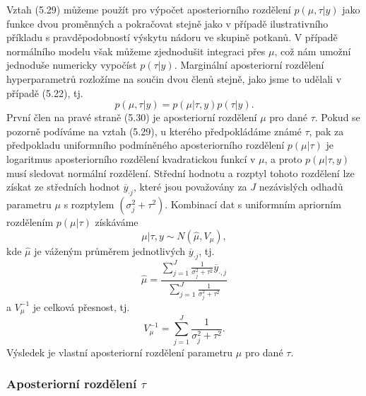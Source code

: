 Vztah (5.29) můžeme použít pro výpočet aposteriorního rozdělení $p(\mu, \tau | y)$ jako funkce dvou proměnných a pokračovat stejně jako v případě ilustrativního příkladu s pravděpodobností výskytu nádoru ve skupině potkanů. V případě normálního modelu však můžeme zjednodušit integraci přes $\mu$, což nám umožní jednoduše numericky vypočíst $p(\tau | y)$. Marginální aposteriorní rozdělení hyperparametrů rozložíme na součin dvou členů stejně, jako jsme to udělali v případě (5.22), tj.
\begin{equation}
p(\mu, \tau | y) = p(\mu | \tau, y)p(\tau | y).
\end{equation}
První člen na pravé straně (5.30) je aposteriorní rozdělení $\mu$ pro dané $\tau$. Pokud se pozorně podíváme na vztah (5.29), u kterého předpokládáme známé $\tau$, pak za předpokladu uniformního podmíněného aposteriorního rozdělení $p(\mu | \tau)$ je logaritmus aposteriorního rozdělení kvadratickou funkcí v $\mu$, a proto $p(\mu | \tau, y)$ musí sledovat normální rozdělení. Střední hodnotu a rozptyl tohoto rozdělení lze získat ze středních hodnot $\overline{y}_{\cdot j}$, které jsou považovány za $J$ nezávislých odhadů parametru $\mu$ s rozptylem $(\sigma_j^2 + \tau^2)$. Kombinací dat s uniformním apriorním rozdělením $p(\mu | \tau)$ získáváme
\begin{equation}
\mu | \tau, y \sim N(\hat{\mu}, V_{\mu}),
\end{equation}
kde $\hat{\mu}$ je váženým průměrem jednotlivých $\overline{y}_{\cdot j}$, tj.
\begin{equation}
\hat{\mu} = \frac{\sum_{j = 1}^J \frac{1}{\sigma_j^2 + \tau^2} \overline{y}_{\cdot, j}}{\sum_{j = 1}^J \frac{1}{\sigma_j^2 + \tau^2}}
\end{equation}
a $V_{\mu}^{-1}$ je celková přesnost, tj.
\begin{equation}
V_{\mu}^{-1} = \sum_{j = 1}^J \frac{1}{\sigma_j^2 + \tau^2}.
\end{equation}
Výsledek je vlastní aposteriorní rozdělení parametru $\mu$ pro dané $\tau$.

\subsubsection{Aposteriorní rozdělení $\tau$}

